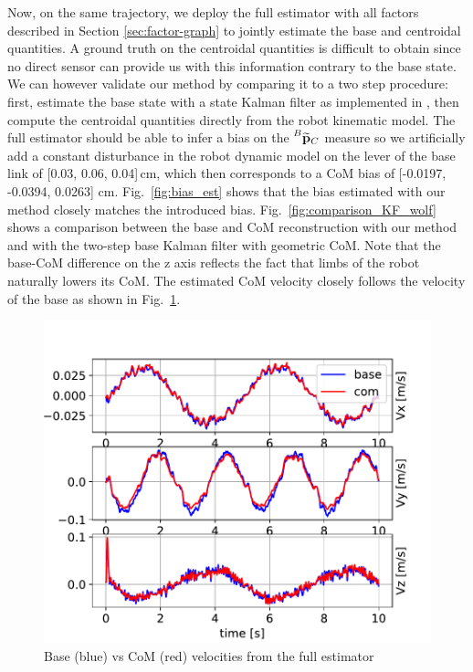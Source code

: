 Now, on the same trajectory, we deploy the full estimator with all factors described in Section \ref{sec:factor-graph} to jointly estimate the base and centroidal quantities. A ground truth on the centroidal quantities is difficult to obtain since no direct sensor can provide us with this information contrary to the base state. 
We can however validate our method by comparing it to a two step procedure: first, estimate the base state with a state Kalman filter as implemented in \cite{bledt2018cheetah}, then compute the centroidal quantities directly from the robot kinematic model. 
The full estimator should be able to infer a bias on the $\prescript{B}{}{\widetilde{{\bf p}}}_{C}$ measure so we artificially add a constant disturbance in the robot dynamic model on the lever of the base link of [0.03, 0.06, 0.04]\,cm, which then corresponds to a CoM bias of [-0.0197, -0.0394,  0.0263] cm. Fig.~\ref{fig:bias_est} shows that the bias estimated with our method closely matches the introduced bias. Fig.~\ref{fig:comparison_KF_wolf} shows a comparison between the base and CoM reconstruction with our method and with the two-step base Kalman filter with geometric CoM. Note that the base-CoM difference on the z axis reflects the fact that limbs of the robot naturally lowers  its CoM. The estimated CoM velocity closely follows the velocity of the base as shown in Fig.~\ref{fig:com_base_vel}.




\begin{figure}[t]
    \centering
    \includegraphics[height=0.6\columnwidth]{figures/centroidal/com_velocity_povcdl_sin.pdf}
    \caption{Base (blue) vs CoM (red) velocities   from the full estimator}
    \label{fig:com_base_vel}
\end{figure}



